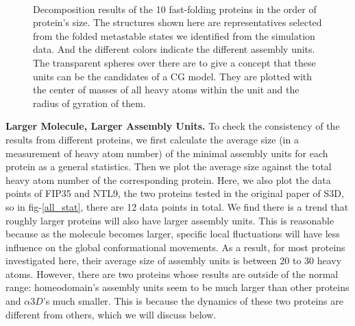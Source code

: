 \documentclass[journal=jacsat,manuscript=article]{achemso}
\begin{document}
\begin{figure}[htbp]
  \\
  \caption{\label{all_beads}Decomposition results of the 10 fast-folding proteins in the order of protein's size. The structures shown here are representatives selected from the folded metastable states we identified from the simulation data. And the different colors indicate the different assembly units. The transparent spheres over there are to give a concept that these units can be the candidates of a CG model. They are plotted with the center of masses of all heavy atoms within the unit and the radius of gyration of them.}
\end{figure}

{\bf Larger Molecule, Larger Assembly Units.} To check the consistency of the results from different proteins, we first calculate the average size (in a measurement of heavy atom number) of the minimal assembly units for each protein as a general statistics. Then we plot the average size against the total heavy atom number of the corresponding protein. Here, we also plot the data points of FIP35 and NTL9, the two proteins tested in the original paper of S3D\cite{Lrenzo_S3D}, so in fig-\ref{all_stat}, there are 12 data points in total. We find there is a trend that roughly larger proteins will also have larger assembly units. This is reasonable because as the molecule becomes larger, specific local fluctuations will have less influence on the global conformational movements. As a result, for most proteins investigated here, their average size of assembly units is between 20 to 30 heavy atoms. However, there are two proteins whose results are outside of the normal range: homeodomain's assembly units seem to be much larger than other proteins and $\alpha 3D$'s much smaller. This is because the dynamics of these two proteins are different from others, which we will discuss below.
\end{document}
